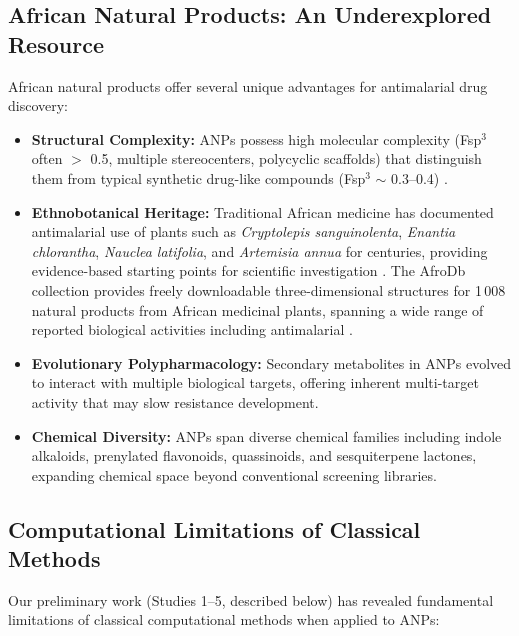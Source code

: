 \documentclass[11pt,a4paper]{article}
\begin{document}
\subsection{African Natural Products: An Underexplored Resource}

African natural products offer several unique advantages for antimalarial drug discovery:

\begin{itemize}[leftmargin=1.5em]
    \item \textbf{Structural Complexity:} ANPs possess high molecular complexity (Fsp$^3$ often $>$ 0.5, multiple stereocenters, polycyclic scaffolds) that distinguish them from typical synthetic drug-like compounds (Fsp$^3$ $\sim$ 0.3--0.4) \cite{lovering2009}.
    \item \textbf{Ethnobotanical Heritage:} Traditional African medicine has documented antimalarial use of plants such as \textit{Cryptolepis sanguinolenta}, \textit{Enantia chlorantha}, \textit{Nauclea latifolia}, and \textit{Artemisia annua} for centuries, providing evidence-based starting points for scientific investigation \cite{bero2009}. The AfroDb collection provides freely downloadable three-dimensional structures for 1\,008 natural products from African medicinal plants, spanning a wide range of reported biological activities including antimalarial \cite{ntiekang2013}.
    \item \textbf{Evolutionary Polypharmacology:} Secondary metabolites in ANPs evolved to interact with multiple biological targets, offering inherent multi-target activity that may slow resistance development.
    \item \textbf{Chemical Diversity:} ANPs span diverse chemical families including indole alkaloids, prenylated flavonoids, quassinoids, and sesquiterpene lactones, expanding chemical space beyond conventional screening libraries.
\end{itemize}

\subsection{Computational Limitations of Classical Methods}

Our preliminary work (Studies 1--5, described below) has revealed fundamental limitations of classical computational methods when applied to ANPs:
\end{document}
